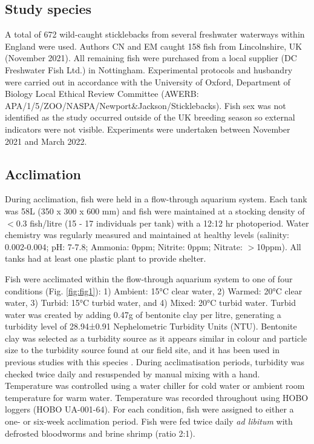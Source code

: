 \documentclass[ASNA,twocolumn]{USG} %
\begin{document}
\subsection{Study species}

A total of 672 wild-caught sticklebacks from several freshwater waterways within England were used. Authors CN and EM caught 158 fish from Lincolnshire, UK (November 2021). All remaining fish were purchased from a local supplier (DC Freshwater Fish Ltd.) in Nottingham. Experimental protocols and husbandry were carried out in accordance with the University of Oxford, Department of Biology Local Ethical Review Committee (AWERB: APA\slash 1\slash 5\slash ZOO\slash NASPA\slash Newport\&Jackson\slash Sticklebacks). Fish sex was not identified as the study occurred outside of the UK breeding season so external indicators were not visible. Experiments were undertaken between November 2021 and March 2022. 

\subsection{Acclimation}

During acclimation, fish were held in a flow-through aquarium system. Each tank was 58L (350 x 300 x 600 mm) and fish were maintained at a stocking density of \begin{math}<\end{math}0.3 fish\slash litre (15 - 17 individuals per tank) with a 12:12 hr photoperiod. Water chemistry was regularly measured and maintained at healthy levels (salinity: 0.002-0.004; pH: 7-7.8; Ammonia: 0ppm; Nitrite: 0ppm; Nitrate: \begin{math}>\end{math}10ppm). All tanks had at least one plastic plant to provide shelter. 

Fish were acclimated within the flow-through aquarium system to one of four conditions (Fig. \ref{fig:fig1}): 1) Ambient: 15°C clear water, 2) Warmed: 20°C clear water, 3) Turbid: 15°C turbid water, and 4) Mixed: 20°C turbid water. Turbid water was created by adding 0.47g of bentonite clay per litre, generating a turbidity level of 28.94±0.91 Nephelometric Turbidity Units (NTU). Bentonite clay was selected as a turbidity source as it appears similar in colour and particle size to the turbidity source found at our field site, and it has been used in previous studies with this species \citep{quesenberryInfluenceTurbidityThreespined2007}. During acclimatisation periods, turbidity was checked twice daily and resuspended by manual mixing with a hand. Temperature was controlled using a water chiller for cold water or ambient room temperature for warm water. Temperature was recorded throughout using HOBO loggers (HOBO UA-001-64). For each condition, fish were assigned to either a one- or six-week acclimation period. Fish were fed twice daily \textit{ad libitum} with defrosted bloodworms and brine shrimp (ratio 2:1). 
\end{document}
